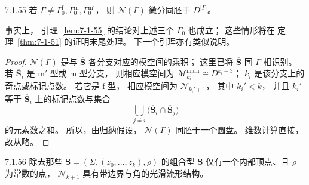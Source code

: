 
\begin{lemma}{7.1.55}\label{lem:7-1-55}
若
$\Gamma\ne
\Gamma_0^{\mathrm f},
\Gamma_0^{\mathrm m},
\Gamma_0^{\mathrm m'}$，
则
$\mathcal N(\Gamma)$
微分同胚于
$D^{|\Gamma|}$。
\end{lemma}

事实上，
引理~\ref{lem:7-1-55}
的结论对上述三个
$\Gamma_0$ 也成立；
这些情形将在
定理~\ref{thm:7-1-51}
的证明末尾处理。
下一个引理亦有类似说明。

\begin{proof}
$\mathcal N(\Gamma)$
是与
$\overline{\mathbf S}$
各分支对应的模空间的乘积；
这里已将
$\overline{\mathbf S}$
同 $\Gamma$ 相识别。
若 $\overline{\mathbf S}_i$
是 $\mathrm m'$ 型或 $\mathrm m$ 型分支，
则相应模空间为
$\mathcal M^{\mathrm{main}}_{k_i}
\cong D^{k_i-3}$；
$k_i$ 是该分支上的奇点或标记点数。
若它是 $\mathrm f$ 型，
相应模空间为
$\mathcal N_{k_i'+1}$，
其中 $k_i'<k$，
并且 $k_i'$
等于
$\overline{\mathbf S}_i$
上的标记点数与集合
\[
\bigcup_{j\ne i}
\bigl(
\overline{\mathbf S}_i\cap
\overline{\mathbf S}_j
\bigr)
\]
的元素数之和。
所以，由归纳假设，
$\mathcal N(\Gamma)$
同胚于一个圆盘。
维数计算直接，故从略。
\end{proof}

\begin{lemma}{7.1.56}\label{lem:7-1-56}
除去那些
$\mathbf S=(\Sigma,(z_0,\ldots,z_k),\rho)$
的组合型
$\overline{\mathbf S}$
仅有一个内部顶点、且 $\rho$ 为常数的点，
$\mathcal N_{k+1}$
具有带边界与角的光滑流形结构。
\end{lemma}

